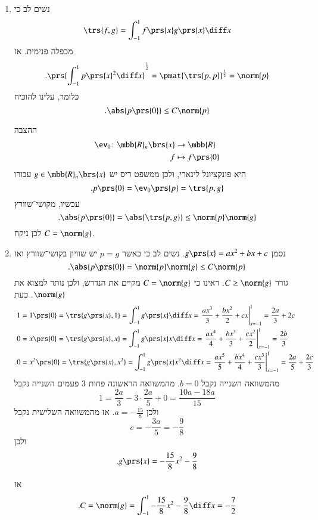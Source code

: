 \documentclass[a4paper,10pt,oneside,openany]{article}
\begin{document}
\begin{solution}
\begin{enumerate}
\item נשים לב כי
\[\trs{f,g} = \int_{-1}^1 f\prs{x} g\prs{x} \diff x\]
מכפלה פנימית.
אז
\begin{align*}
\text{.} \prs{\int_{-1}^1 p\prs{x}^2 \diff x}^{\frac{1}{2}} = \pmat{\trs{p,p}}^{\frac{1}{2}} = \norm{p}
\end{align*}
כלומר, עלינו להוכיח
\[\text{.} \abs{p\prs{0}} \leq C\norm{p}\]

ההצבה
\begin{align*}
\ev_0 \colon \mbb{R}_n\brs{x} &\to \mbb{R} \\
f &\mapsto f\prs{0}
\end{align*}
היא פונקציונל לינארי, ולכן ממשפט ריס יש
$g \in \mbb{R}_n\brs{x}$
עבורו
\[\text{.} p\prs{0} = \ev_0\prs{p} = \trs{p,g}\]
עכשיו, מקושי־שוורץ
\[\text{.} \abs{p\prs{0}} = \abs{\trs{p,g}} \leq \norm{p} \norm{g}\]
לכן ניקח
$C = \norm{g}$.

\item
נסמן
$g\prs{x} = ax^2 + bx + c$.
נשים לב כי
כאשר
$p = g$
יש שוויון בקושי־שוורץ ואז
\[\text{.} \abs{p\prs{0}} = \norm{p}\norm{g} \leq C\norm{p}\]
גורר
$C \geq \norm{g}$.
ראינו כי
$C = \norm{g}$
מקיים את הנדרש, ולכן נותר למצוא את
$\norm{g}$.
כעת
\begin{align*}
1 &= 1\prs{0} = \trs{g\prs{x},1} = \int_{-1}^1 g\prs{x} \diff x = \left. \frac{ax^3}{3} + \frac{bx^2}{2} + cx \right|_{x=-1}^1 = \frac{2a}{3} + 2c \\
0 &= x\prs{0} = \trs{g\prs{x}, x} = \int_{-1}^1 g\prs{x} x \diff x = \left. \frac{ax^4}{4} + \frac{bx^3}{3} + \frac{cx^2}{2} \right|_{x=-1}^1 = \frac{2b}{3} \\
\text{.} 0 &= x^2\prs{0} = \trs{g\prs{x}, x^2} = \int_{-1}^1 g\prs{x} x^2 \diff x = \left. \frac{ax^5}{5} + \frac{bx^4}{4} + \frac{cx^3}{3} \right|_{x=-1}^1 = \frac{2a}{5} + \frac{2c}{3}
\end{align*}
מהמשוואה השנייה נקבל
$b = 0$.
מהמשוואה הראשונה פחות
$3$
פעמים השנייה נקבל
\[1 = \frac{2a}{3} - 3 \cdot \frac{2a}{5} + 0 = \frac{10a - 18a}{15}\]
ולכן
$a = -\frac{15}{8}$.
אז מהמשוואה השלישית נקבל
\[c = -\frac{3a}{5} = -\frac{9}{8}\]
ולכן
\[\text{.} g\prs{x} = -\frac{15}{8} x^2 - \frac{9}{8}\]

אז
\[\text{.} C = \norm{g} = \int_{-1}^1 -\frac{15}{8} x^2 - \frac{9}{8} \diff x = -\frac{7}{2}\]
\end{enumerate}
\end{solution}
\end{document}

